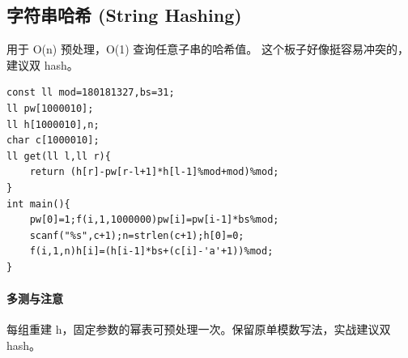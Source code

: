 \subsection{字符串哈希 (String Hashing)}
用于 O(n) 预处理，O(1) 查询任意子串的哈希值。
这个板子好像挺容易冲突的，建议双 hash。
\begin{lstlisting}
const ll mod=180181327,bs=31;
ll pw[1000010];
ll h[1000010],n;
char c[1000010];
ll get(ll l,ll r){
    return (h[r]-pw[r-l+1]*h[l-1]%mod+mod)%mod;
}
int main(){
    pw[0]=1;f(i,1,1000000)pw[i]=pw[i-1]*bs%mod;
    scanf("%s",c+1);n=strlen(c+1);h[0]=0;
    f(i,1,n)h[i]=(h[i-1]*bs+(c[i]-'a'+1))%mod;
}
\end{lstlisting}

\paragraph{多测与注意} 每组重建 h，固定参数的幂表可预处理一次。保留原单模数写法，实战建议双 hash。
